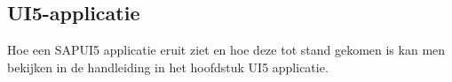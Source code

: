 %        
%            
%            
%            
%        
%            
%            
%            
            
        \subsection{UI5-applicatie}
        Hoe een SAPUI5 applicatie eruit ziet en hoe deze tot stand gekomen is kan men bekijken in de handleiding in het hoofdstuk UI5 applicatie.